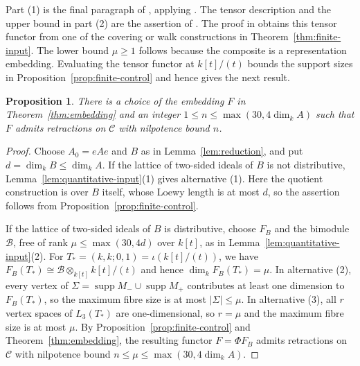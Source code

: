 \documentclass[a4paper,reqno,10pt]{amsart}
\newtheorem{proposition}[theorem]{Proposition}
\theoremstyle{definition}
\DeclareMathOperator{\supp}{supp}
\newcommand{\dm}{\dim_k}
\newcommand{\C}{\mathcal C}
\numberwithin{equation}{section}
\begin{document}
Part (1) is the final paragraph of \cite[\S5.2]{Bongartz}, applying
\cite[Corollary~2]{Bongartz}. The tensor description and the upper bound
in part (2) are the assertion of \cite[Theorem~7]{Bongartz}.
The proof in \cite[\S5.4]{Bongartz} obtains this tensor functor from
one of the covering or walk constructions in
Theorem~\ref{thm:finite-input}. The lower bound $\mu\ge1$ follows because
the composite is a representation embedding. Evaluating the tensor
functor at $k[t]/(t)$ bounds the support sizes in
Proposition~\ref{prop:finite-control} and hence gives the next result.
\begin{proposition}\label{prop:global-refinement}
There is a choice of the embedding $F$ in Theorem~\ref{thm:embedding}
and an integer $1\le n\le\max(30,4\dm A)$ such that $F$ admits
retractions on $\C$ with nilpotence bound $n$.
\end{proposition}
\begin{proof}
Choose $A_0=eAe$ and $B$ as in Lemma~\ref{lem:reduction}, and put
$d=\dm B\le\dm A$. If the lattice of two-sided ideals of $B$ is not
distributive, Lemma~\ref{lem:quantitative-input}(1) gives alternative (1). Here the quotient construction is over $B$ itself, whose Loewy length
is at most $d$, so the assertion follows
from Proposition~\ref{prop:finite-control}.

If the lattice of two-sided ideals of $B$ is distributive, choose
$F_B$ and the bimodule $\mathcal B$, free of rank $\mu\le\max(30,4d)$ over $k[t]$, as
in Lemma~\ref{lem:quantitative-input}(2). For
$T_*=(k,k;0,1)=\iota(k[t]/(t))$, we have
$F_B(T_*)\cong \mathcal B\otimes_{k[t]}k[t]/(t)$ and hence $\dm F_B(T_*)=\mu$.
In alternative (2), every vertex of
$\Sigma=\supp M_-\cup\supp M_+$ contributes at least one dimension
to $F_B(T_*)$, so the maximum fibre size is at most
$|\Sigma|\le \mu$. In alternative (3), all $r$ vertex spaces of
$L_3(T_*)$ are one-dimensional, so $r=\mu$ and the maximum fibre size
is at most $\mu$. By Proposition~\ref{prop:finite-control} and Theorem~\ref{thm:embedding}, the resulting functor $F=\Phi F_B$ admits retractions on $\C$ with nilpotence bound $n\le\mu\le\max(30,4\dm A)$.
\end{proof}
\end{document}
